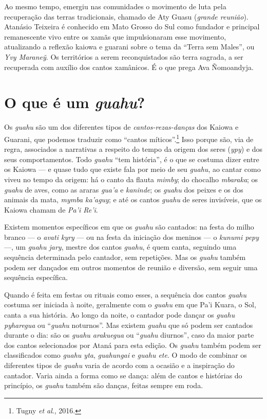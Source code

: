 Ao mesmo tempo, emergiu nas comunidades o movimento de luta pela
recuperação das terras tradicionais, chamado de Aty Guasu (\textit{grande
reunião}). Atanásio Teixeira é conhecido em Mato Grosso do Sul como
fundador e principal remanescente vivo entre os xamãs que impulsionaram
esse movimento, atualizando a reflexão kaiowa e guarani sobre o tema da
``Terra sem Males'', ou \textit{Yvy Maraneỹ}. Os territórios a serem
reconquistados são terra sagrada, a ser recuperada com auxílio dos
cantos xamânicos. É o que prega Ava Ñomoandyja.

\section{O que é um \textit{guahu}?}

Os \textit{guahu} são um dos diferentes tipos de \textit{cantos-rezas-danças} dos
Kaiowa e Guarani, que podemos traduzir como ``cantos míticos''.\footnote{Tugny
\textit{et al}., 2016.} Isso porque são, via de regra, associados a
narrativas a respeito do tempo da origem dos seres (\textit{ypy}) e dos
seus comportamentos. Todo \textit{guahu} ``tem história'', é o que se
costuma dizer entre os Kaiowa --- e quase tudo que existe fala por meio de
seu \textit{guahu}, ao cantar como viveu no tempo da origem: há o canto da
flauta \textit{mimby}; do chocalho \textit{mbaraka}; os \textit{guahu} de
aves, como as araras \textit{gua'a} e \textit{kaninde}; os \textit{guahu} dos
peixes e os dos animais da mata, \textit{mymba ka'aguy}; e até os cantos
\textit{guahu} de seres invisíveis, que os Kaiowa chamam de \textit{Pa'i
Re'i}.

Existem momentos específicos em que os \textit{guahu} são cantados: na
festa do milho branco --- o \textit{avati kyry} --- ou na festa da iniciação
dos meninos --- o \textit{kunumi pepy} ---, um \textit{guahu jary}, mestre dos
cantos \textit{guahu}, é quem canta, seguindo uma sequência determinada
pelo cantador, sem repetições. Mas os \textit{guahu} também podem ser
dançados em outros momentos de reunião e diversão, sem seguir uma
sequência específica.

Quando é feita em festas ou rituais como esses, a sequência dos cantos
\textit{guahu} costuma ser iniciada à noite, geralmente com o \textit{guahu}
em que Pa'i Kuara, o Sol, canta a sua história. Ao longo da noite, o
cantador pode dançar os \textit{guahu pyharegua} ou ``\textit{guahu} noturnos''.
Mas existem \textit{guahu} que só podem ser cantados durante o dia: são os
\textit{guahu arakuegua} ou ``\textit{guahu} diurnos'', caso da maior parte dos
cantos selecionados por Ataná para esta edição. Os \textit{guahu} também
podem ser classificados como \textit{guahu yta}, \textit{guahungai} e
\textit{guahu ete}. O modo de combinar os diferentes tipos de \textit{guahu}
varia de acordo com a ocasião e a inspiração do cantador. Varia ainda a
forma como se dança: além de cantos e histórias do princípio, os
\textit{guahu} também são danças, feitas sempre em roda.

